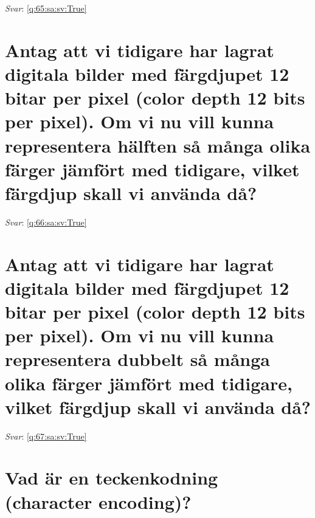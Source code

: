 \documentclass[a4paper,11pt,oneside]{book}
\begin{document}
\begin{sloppypar}
\vspace{1cm}

\textit{Svar}: \autoref{q:65:sa:sv:True}



\section{Antag att vi tidigare har lagrat digitala bilder med f\"argdjupet 12 bitar per pixel (color depth 12 bits per pixel). Om vi nu vill kunna representera h\"alften s\r{a} m\r{a}nga olika f\"arger j\"amf\"ort med tidigare, vilket f\"argdjup skall vi anv\"anda d\r{a}?}

\label{q:66:sa:sv:False}

\vspace{2cm}

\noindent\makebox[\textwidth]{\hrulefill}

\vspace{1cm}

\textit{Svar}: \autoref{q:66:sa:sv:True}



\section{Antag att vi tidigare har lagrat digitala bilder med f\"argdjupet 12 bitar per pixel (color depth 12 bits per pixel). Om vi nu vill kunna representera dubbelt s\r{a} m\r{a}nga olika f\"arger j\"amf\"ort med tidigare, vilket f\"argdjup skall vi anv\"anda d\r{a}?}

\label{q:67:sa:sv:False}

\vspace{2cm}

\noindent\makebox[\textwidth]{\hrulefill}

\vspace{1cm}

\textit{Svar}: \autoref{q:67:sa:sv:True}



\section{Vad \"ar en teckenkodning (character encoding)?}

\label{q:68:sa:sv:False}

\vspace{2cm}

\noindent\makebox[\textwidth]{\hrulefill}

\vspace{1cm}


\end{sloppypar}
\end{document}
